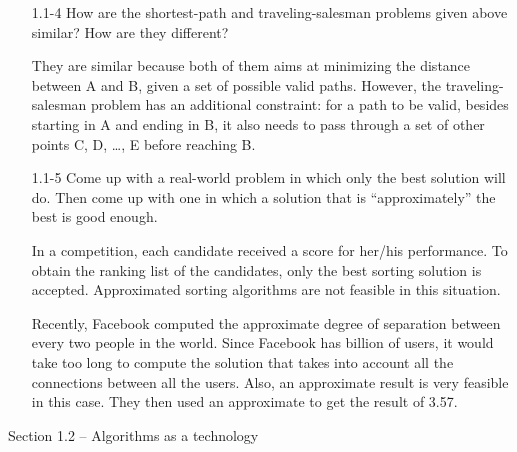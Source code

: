 \documentclass{report}
\makeatletter
\renewenvironment{framed}{%
 \def\FrameCommand##1{\hskip\@totalleftmargin
 \fboxsep=\FrameSep\fbox{##1}}%
 \MakeFramed {\advance\hsize-\width
   \@totalleftmargin\z@ \linewidth\hsize
   \@setminipage}}%
 {\par\unskip\endMakeFramed}
\makeatother
\begin{document}
\begin{enumerate}
\item[1.1{-}4] How are the shortest-path and traveling-salesman problems
  given above similar? How are they different?

\begin{framed}
They are similar because both of them aims at minimizing the distance between
A and B, given a set of possible valid paths. However, the traveling-salesman
problem has an additional constraint: for a path to be valid, besides starting
in A and ending in B, it also needs to pass through a set of other points C, D,
\ldots, E before reaching B.
\end{framed}

\item[1.1{-}5] Come up with a real-world problem in which only the best
  solution will do. Then come up with one in which a solution that is
  ``approximately'' the best is good enough.

\begin{framed}
In a competition, each candidate received a score for her/his performance. To
obtain the ranking list of the candidates, only the best sorting solution is
accepted. Approximated sorting algorithms are not feasible in this situation.

Recently, Facebook computed the approximate degree of separation between every
two people in the world. Since Facebook has billion of users, it would take too
long to compute the solution that takes into account all the connections between
all the users. Also, an approximate result is very feasible in this case. They
then used an approximate to get the result of 3.57.
\end{framed}

\end{enumerate}

\pagebreak

{\large Section 1.2 {--} Algorithms as a technology}
\end{document}
